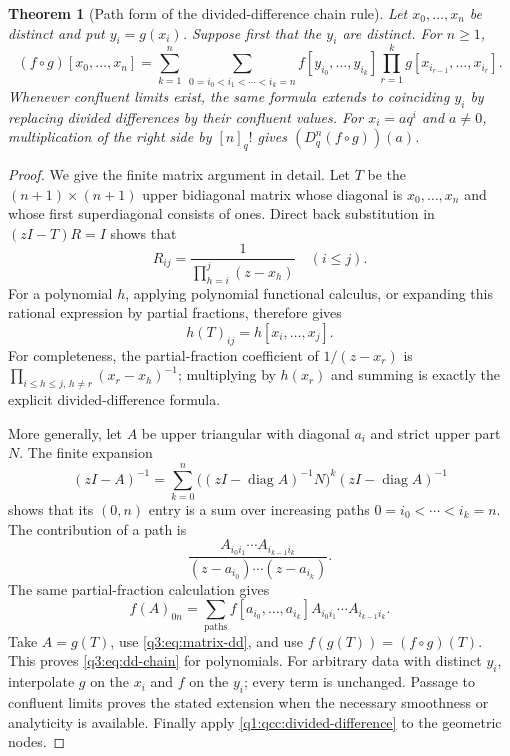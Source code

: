 \documentclass[11pt,a4paper,oneside,openany]{book}
\newtheorem{theorem}{Theorem}[chapter]
\theoremstyle{definition}
\theoremstyle{remark}
\newcommand{\qfac}[1]{[#1]_q!}
\newcommand{\Dq}{D_q}
\begin{document}
\begin{theorem}[Path form of the divided-difference chain rule]
Let $x_0,\ldots,x_n$ be distinct and put $y_i=g(x_i)$. Suppose first that
the $y_i$ are distinct. For $n\ge1$,
\begin{equation}
 \boxed{\displaystyle
 (f\circ g)[x_0,\ldots,x_n]
 =\sum_{k=1}^n\ \sum_{0=i_0<i_1<\cdots<i_k=n}
   f[y_{i_0},\ldots,y_{i_k}]
   \prod_{r=1}^k g[x_{i_{r-1}},\ldots,x_{i_r}].}
 \label{q3:eq:dd-chain}
\end{equation}
Whenever confluent limits exist, the same formula extends to coinciding
$y_i$ by replacing divided differences by their confluent values.
For $x_i=aq^i$ and $a\ne0$, multiplication of the right side by
$\qfac n$ gives $(\Dq^n(f\circ g))(a)$.
\end{theorem}
\begin{proof}
We give the finite matrix argument in detail. Let $T$ be the
$(n+1)\times(n+1)$ upper bidiagonal matrix whose diagonal is
$x_0,\ldots,x_n$ and whose first superdiagonal consists of ones. Direct
back substitution in $(zI-T)R=I$ shows that
\[
 R_{ij}=\frac1{\prod_{h=i}^j(z-x_h)}\quad(i\le j).
\]
For a polynomial $h$, applying polynomial functional calculus, or
expanding this rational expression by partial fractions, therefore gives
\begin{equation}
 h(T)_{ij}=h[x_i,\ldots,x_j].
 \label{q3:eq:matrix-dd}
\end{equation}
For completeness, the partial-fraction coefficient of $1/(z-x_r)$ is
$\prod_{i\le h\le j,\,h\ne r}(x_r-x_h)^{-1}$; multiplying by $h(x_r)$
and summing is exactly the explicit divided-difference formula.

More generally, let $A$ be upper triangular with diagonal $a_i$ and
strict upper part $N$. The finite expansion
\[
 (zI-A)^{-1}
 =\sum_{k=0}^n\bigl((zI-\operatorname{diag}A)^{-1}N\bigr)^k
                (zI-\operatorname{diag}A)^{-1}
\]
shows that its $(0,n)$ entry is a sum over increasing paths
$0=i_0<\cdots<i_k=n$. The contribution of a path is
\[
 \frac{A_{i_0i_1}\cdots A_{i_{k-1}i_k}}
      {(z-a_{i_0})\cdots(z-a_{i_k})}.
\]
The same partial-fraction calculation gives
\[
 f(A)_{0n}=\sum_{\text{paths}}%
       f[a_{i_0},\ldots,a_{i_k}]
       A_{i_0i_1}\cdots A_{i_{k-1}i_k}.
\]
Take $A=g(T)$, use \cref{q3:eq:matrix-dd}, and use
$f(g(T))=(f\circ g)(T)$. This proves \cref{q3:eq:dd-chain} for
polynomials. For arbitrary data with distinct $y_i$, interpolate $g$
on the $x_i$ and $f$ on the $y_i$; every term is unchanged. Passage to
confluent limits proves the stated extension when the necessary
smoothness or analyticity is available. Finally apply
\cref{q1:qcc:divided-difference} to the geometric nodes.
\end{proof}
\end{document}
